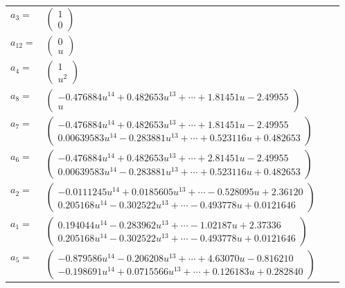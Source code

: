 \documentclass[1p]{elsarticle_modified}
\theoremstyle{definition}
\begin{document}
\begin{tabular}{m{7pt} m{180pt} m{7pt} m{180pt} }
\flushright $a_{3}=$&$\begin{pmatrix}1\\0\end{pmatrix}$ \\
\flushright $a_{12}=$&$\begin{pmatrix}0\\u\end{pmatrix}$ \\
\flushright $a_{4}=$&$\begin{pmatrix}1\\u^2\end{pmatrix}$ \\
\flushright $a_{8}=$&$\begin{pmatrix}-0.476884 u^{14}+0.482653 u^{13}+\cdots+1.81451 u-2.49955\\u\end{pmatrix}$ \\
\flushright $a_{7}=$&$\begin{pmatrix}-0.476884 u^{14}+0.482653 u^{13}+\cdots+1.81451 u-2.49955\\0.00639583 u^{14}-0.283881 u^{13}+\cdots+0.523116 u+0.482653\end{pmatrix}$ \\
\flushright $a_{6}=$&$\begin{pmatrix}-0.476884 u^{14}+0.482653 u^{13}+\cdots+2.81451 u-2.49955\\0.00639583 u^{14}-0.283881 u^{13}+\cdots+0.523116 u+0.482653\end{pmatrix}$ \\
\flushright $a_{2}=$&$\begin{pmatrix}-0.0111245 u^{14}+0.0185605 u^{13}+\cdots-0.528095 u+2.36120\\0.205168 u^{14}-0.302522 u^{13}+\cdots-0.493778 u+0.0121646\end{pmatrix}$ \\
\flushright $a_{1}=$&$\begin{pmatrix}0.194044 u^{14}-0.283962 u^{13}+\cdots-1.02187 u+2.37336\\0.205168 u^{14}-0.302522 u^{13}+\cdots-0.493778 u+0.0121646\end{pmatrix}$ \\
\flushright $a_{5}=$&$\begin{pmatrix}-0.879586 u^{14}-0.206208 u^{13}+\cdots+4.63070 u-0.816210\\-0.198691 u^{14}+0.0715566 u^{13}+\cdots+0.126183 u+0.282840\end{pmatrix}$ \\

\end{tabular}
\end{document}
